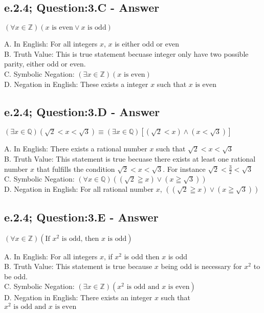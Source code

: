 \subsection{e.2.4; Question:3.C - Answer}
	\begin{center}
		$(\forall x \in \mathbb{Z})(x \text{ is even} \vee x \text{ is odd})$
	\end{center}
A. In English: For all integers $x$, $x$ is either odd or even \\
B. Truth Value: This is true statement becuase integer only have two possible parity, either odd or even. \\
C. Symbolic Negation: $(\exists x \in \mathbb{Z})(x \text{ is even})$ \\
D. Negation in English: These exists a integer $x$ such that  $x \text{ is even}$ \\


\subsection{e.2.4; Question:3.D - Answer}
	\begin{center}
		$(\exists x \in \mathbb{Q})(\sqrt{2} < x < \sqrt{3}) \equiv (\exists x \in \mathbb{Q})[(\sqrt{2} < x) \wedge (x < \sqrt{3})]$
	\end{center}
A. In English: There exists a rational number $x$ such that $\sqrt{2} < x < \sqrt{3}$ \\
B. Truth Value: This statement is true becuase there exists at least one rational number $x$ that fulfills the condition $\sqrt{2} < x < \sqrt{3}$. For instance $\sqrt{2} < \frac{3}{2} < \sqrt{3}$ \\
C. Symbolic Negation: $(\forall x \in \mathbb{Q})((\sqrt{2} \geqq x) \vee (x \geqq \sqrt{3}))$ \\
D. Negation in English: For all rational number $x$, $((\sqrt{2} \geqq x) \vee (x \geqq \sqrt{3}))$ \\


\subsection{e.2.4; Question:3.E - Answer}
	\begin{center}
		$(\forall x \in \mathbb{Z})(\text{If } x^2 \text{ is odd, then } x \text{ is odd})$
	\end{center}
A. In English: For all integers $x$, if $x^2$ is odd then $x$ is odd \\
B. Truth Value: This statement is true because $x$ being odd is necessary for $x^2$ to be odd. \\
C. Symbolic Negation: $(\exists x \in \mathbb{Z})(x^2 \text{ is odd and } x \text{ is even})$ \\
D. Negation in English: There exists an integer $x$ such that $x^2 \text{ is odd and } x \text{ is even} $ \\


